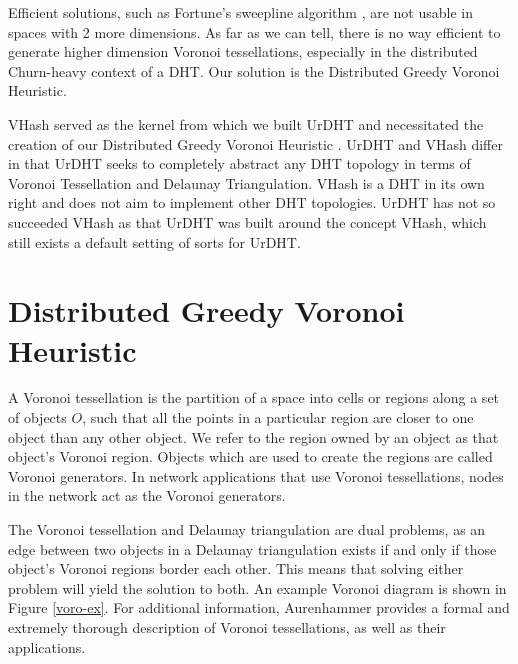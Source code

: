 Efficient solutions, such as Fortune's sweepline algorithm \cite{fortune1987sweepline}, are not usable in spaces with 2 more dimensions.
As far as we can tell, there is no way efficient to generate higher dimension Voronoi tessellations, especially in the distributed Churn-heavy context of a DHT.
Our solution is the Distributed Greedy Voronoi Heuristic.

VHash served as the kernel from which we built UrDHT \cite{urdht} and  necessitated the creation of our Distributed Greedy Voronoi Heuristic \cite{dgvh}.
UrDHT and VHash differ in that UrDHT seeks to completely abstract any DHT topology in terms of Voronoi Tessellation and Delaunay Triangulation.
VHash is a DHT in its own right and does not aim to implement other DHT topologies.
UrDHT has not so succeeded VHash as that UrDHT was built around the concept VHash, which still exists a default setting of sorts for UrDHT.

\section{Distributed Greedy Voronoi Heuristic}
A Voronoi tessellation is the partition of a space into cells or regions along a set of objects $O$, such that all the points in a particular region are closer to one object than any other object.
We refer to the region owned by an object as that object's Voronoi region.
Objects which are used to create the regions are called Voronoi generators.
In network applications that use Voronoi tessellations, nodes in the network act as the Voronoi generators.

The Voronoi tessellation and Delaunay triangulation are dual problems, as an edge between two objects in a Delaunay triangulation exists if and only if those object's Voronoi regions border each other.
This means that solving either problem will yield the solution to both.
An example Voronoi diagram is shown in Figure \ref{voro-ex}.
For additional information, Aurenhammer \cite{voronoi} provides a formal and extremely thorough description of Voronoi tessellations, as well as their applications.


